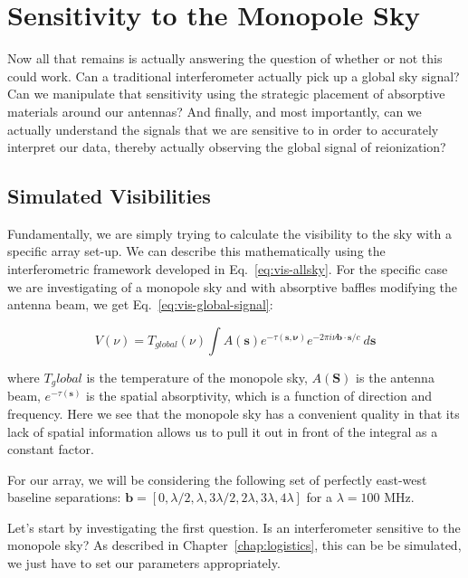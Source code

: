 \chapter{Sensitivity to the Monopole Sky}

Now all that remains is actually answering the question of whether or not this 
could work.  Can a traditional interferometer actually pick up a global sky 
signal?  Can we manipulate that sensitivity using the strategic placement of 
absorptive materials around our antennas? And finally, and most importantly, 
can we actually understand the signals that we are sensitive to in order to 
accurately interpret our data, thereby actually observing the global signal of 
reionization?

\section{Simulated Visibilities}

Fundamentally, we are simply trying to calculate the visibility to the sky with 
a specific array set-up. We can describe this mathematically using the 
interferometric framework developed in Eq.~\eqref{eq:vis-allsky}. For the 
specific case we are investigating of a monopole sky and with absorptive 
baffles modifying the antenna beam, we get Eq.~\eqref{eq:vis-global-signal}:

\begin{equation}
 V(\nu) = T_{global}(\nu) \int A(\mathbf{s}) e^{-\tau(\mathbf{s,\nu})} e^{-2\pi 
 i \nu \mathbf{b}\cdot\mathbf{s}/c} ~d\mathbf{s}
    \label{eq:vis-global-signal}
\end{equation}

where $T_global$ is the temperature of the monopole sky, $A(\mathbf{S})$ is the 
antenna beam, $e^{-\tau(\mathbf{s})}$ is the spatial absorptivity, which is a 
function of direction and frequency. Here we see that the monopole sky has a 
convenient quality in that its lack of spatial information allows us to pull it 
out in front of the integral as a constant factor.

For our array, we will be considering the following set of perfectly east-west 
baseline separations: $\mathbf{b} = [0, \lambda/2, \lambda, 3\lambda/2, 
2\lambda, 3\lambda, 4\lambda]$ for a $\lambda = 100$ MHz.

Let's start by investigating the first question. Is an interferometer sensitive 
to the monopole sky? As described in Chapter~\ref{chap:logistics}, this can be 
be simulated, we just have to set our parameters appropriately.

